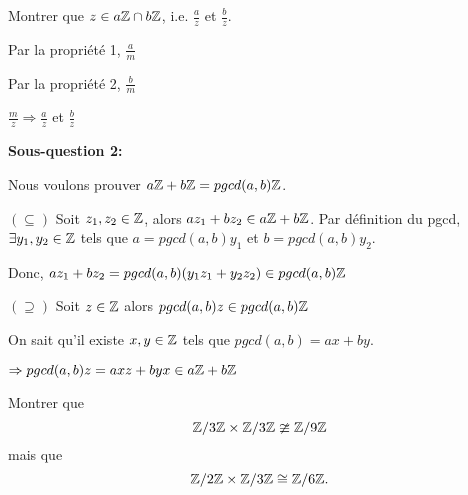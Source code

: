Montrer que $z \in a\mathbb{Z} \cap b\mathbb{Z}$, i.e. $\frac{a}{z}$ et $\frac{b}{z}$. 

\begin{minipage}{.5\textwidth}
	Par la propriété 1, $\frac{a}{m}$

	Par la propriété 2, $\frac{b}{m}$
\end{minipage}
\begin{minipage}{.5\textwidth}
	$\frac{m}{z} \Rightarrow \frac{a}{z}$ et $\frac{b}{z}$ 
\end{minipage}

\vspace*{0.3cm}

\textbf{Sous-question 2:}

Nous voulons prouver $a\mathbb{Z} + b\mathbb{Z} = pgcd(a,b)\mathbb{Z}$.

$(\subseteq)$ Soit $z_1,z_2 \in \mathbb{Z}$, alors $a z_1 + b z_2 \in a\mathbb{Z} + b\mathbb{Z}$. Par définition du pgcd, $\exists y_1,y_2 \in \mathbb{Z}$ tels que $a = pgcd(a,b)y_1$ et $b = pgcd(a,b)y_2$.

Donc, $az_1 + bz_2 = pgcd(a,b)(y_1 z_1 + y_2 z_2) \in pgcd(a,b)\mathbb{Z}$

$(\supseteq)$ Soit $z\in \mathbb{Z}$ alors $pgcd(a,b)z \in pgcd(a,b)\mathbb{Z}$

On sait qu'il existe $x,y \in \mathbb{Z}$ tels que $pgcd(a,b) = ax + by$.

$\Rightarrow pgcd(a,b)z = axz+byx \in a\mathbb{Z} + b\mathbb{Z}$

\vspace*{0.8cm}

\newpage


\begin{exo}
Montrer que $$\mathbb{Z}/3\mathbb{Z} \times \mathbb{Z}/3\mathbb{Z} \ncong \mathbb{Z}/9\mathbb{Z}$$ mais que $$\mathbb{Z}/2\mathbb{Z} \times \mathbb{Z}/3\mathbb{Z} \cong \mathbb{Z}/6\mathbb{Z}.$$

\end{exo}